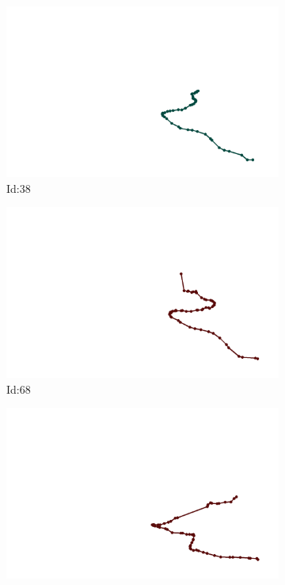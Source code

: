 \documentclass[12pt,twoside]{report}
\begin{document}
\begin{figure}
\centering
\begin{subfigure}[b]{0.20\textwidth}
\centering
\includegraphics[width=\textwidth]{../../trajectories/38.png}
\caption{Id:38}
\end{subfigure}
\begin{subfigure}[b]{0.20\textwidth}
\centering
\includegraphics[width=\textwidth]{../../trajectories/68.png}
\caption{Id:68}
\end{subfigure}
\begin{subfigure}[b]{0.20\textwidth}
\centering
\includegraphics[width=\textwidth]{../../trajectories/180.png}

\end{subfigure}
\end{figure}
\end{document}
